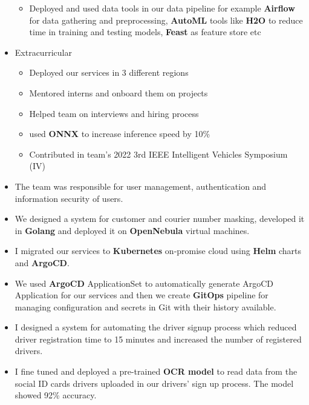 \begin{itemize}
\begin{itemize}
    \item Deployed and used data tools in our data pipeline for example \textbf{Airflow} for data gathering and preprocessing, \textbf{AutoML} tools like \textbf{H2O} to reduce time in training and testing models, \textbf{Feast} as feature store etc
  \end{itemize}
  \item Extracurricular
  \begin{itemize}
    \item Deployed our services in 3 different regions
    \item Mentored interns and onboard them on projects
    \item Helped team on interviews and hiring process
    \item used \textbf{ONNX} to increase inference speed by 10\%
    \item Contributed in team's 2022 3rd IEEE Intelligent Vehicles Symposium (IV)
  \end{itemize}
\end{itemize}

\vspace{0.5cm}

\begin{itemize}
  \item The team was responsible for user management, authentication and information security of users.
  \item We designed a system for customer and courier number masking, developed it in \textbf{Golang} and deployed it on \textbf{OpenNebula} virtual machines.
  \item I migrated our services to \textbf{Kubernetes} on‐promise cloud using \textbf{Helm} charts and \textbf{ArgoCD}.
  \item We used \textbf{ArgoCD} ApplicationSet to automatically generate ArgoCD Application for our services and then we create \textbf{GitOps} pipeline for managing configuration and secrets in Git with their history available.
  \item I designed a system for automating the driver signup process which reduced driver registration time to 15 minutes and increased the number of registered drivers.
  \item I fine tuned and deployed a pre-trained \textbf{OCR model} to read data from the social ID cards drivers uploaded in our drivers' sign up process. The model showed 92\% accuracy.
\end{itemize}

